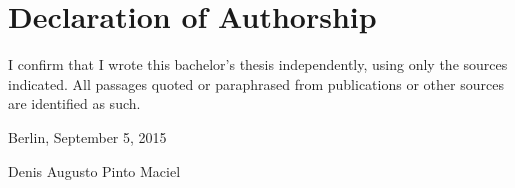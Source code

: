 \section*{Declaration of Authorship}

I confirm that I wrote this bachelor's thesis independently, using only the sources indicated. All passages quoted or paraphrased from publications or other sources are identified as such.
\vspace{1cm}
\begin{center}
Berlin, September 5, 2015 \vspace{0.5cm}

Denis Augusto Pinto Maciel
\end{center}
